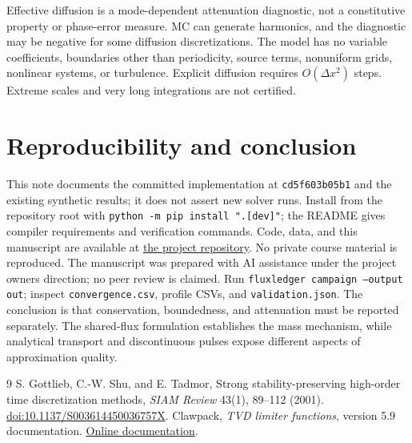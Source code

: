 \documentclass[10pt,a4paper]{article}
\begin{document}
Effective diffusion is a mode-dependent attenuation diagnostic, not a constitutive property or phase-error measure. MC can generate harmonics, and the diagnostic may be negative for some diffusion discretizations. The model has no variable coefficients, boundaries other than periodicity, source terms, nonuniform grids, nonlinear systems, or turbulence. Explicit diffusion requires $O(\Delta x^2)$ steps. Extreme scales and very long integrations are not certified.
\section{Reproducibility and conclusion}
This note documents the committed implementation at \texttt{cd5f603b05b1} and the existing synthetic results; it does not assert new solver runs. Install from the repository root with \texttt{python -m pip install ".[dev]"}; the README gives compiler requirements and verification commands. Code, data, and this manuscript are available at \href{https://github.com/racostacme-come/fluxledger}{the project repository}. No private course material is reproduced. The manuscript was prepared with AI assistance under the project owner\textquotesingle s direction; no peer review is claimed.
Run \texttt{fluxledger campaign --output out}; inspect \texttt{convergence.csv}, profile CSVs, and \texttt{validation.json}. The conclusion is that conservation, boundedness, and attenuation must be reported separately. The shared-flux formulation establishes the mass mechanism, while analytical transport and discontinuous pulses expose different aspects of approximation quality.
\begin{thebibliography}{9}
 S. Gottlieb, C.-W. Shu, and E. Tadmor, Strong stability-preserving high-order time discretization methods, \emph{SIAM Review} 43(1), 89--112 (2001). \href{https://doi.org/10.1137/S003614450036757X}{doi:10.1137/S003614450036757X}.
 Clawpack, \emph{TVD limiter functions}, version 5.9 documentation. \href{https://www.clawpack.org/v5.9.x/pyclaw/evolve/limiters.html}{Online documentation}.
\end{thebibliography}
\end{document}
